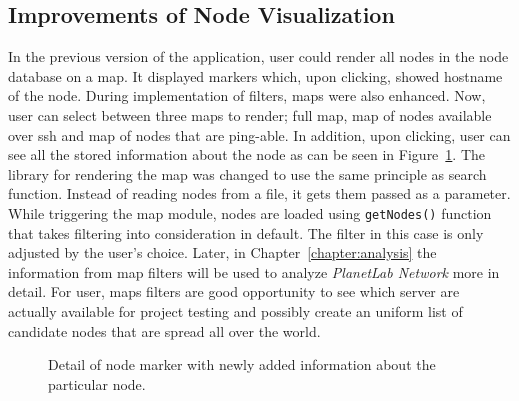 {{{{{{\subsection{Improvements of Node Visualization}
In the previous version of the application, user could render all nodes in the node database on a map. It displayed markers which, upon clicking, showed hostname of the node. During implementation of filters, maps were also enhanced. Now, user can select between three maps to render; full map, map of nodes available over ssh and map of nodes that are ping-able. In addition, upon clicking, user can see all the stored information about the node as can be seen in Figure~\ref{fig:mapnodedetail}. The library for rendering the map was changed to use the same principle as search function. Instead of reading nodes from a file, it gets them passed as a parameter. While triggering the map module, nodes are loaded using \texttt{getNodes()} function that takes filtering into consideration in default. The filter in this case is only adjusted by the user's choice. Later, in Chapter~\ref{chapter:analysis} the information from map filters will be used to analyze \textit{PlanetLab Network} more in detail. For user, maps filters are good opportunity to see which server are actually available for project testing and possibly create an uniform list of candidate nodes that are spread all over the world. 

\begin{figure}[H]
	\centering
	\caption{Detail of node marker with newly added information about the particular node.}
	\label{fig:mapnodedetail}
\end{figure}

}}}}}}
